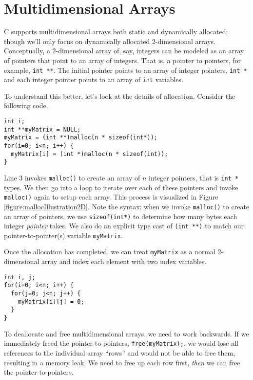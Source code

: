 \section{Multidimensional Arrays}

C supports multidimensional arrays both static and dynamically
allocated; though we'll only focus on dynamically allocated 2-dimensional
arrays.  Conceptually, a 2-dimensional array of, say, integers can
be modeled as an array of pointers that point to an array of integers.
That is, a pointer to pointers, for example, \texttt{int **}.  
The initial pointer points to an array of integer pointers, \texttt{int *}
and each integer pointer points to an array of \texttt{int} variables.

To understand this better, let's look at the details of allocation.  Consider
the following code.

\begin{verbatim}
int i;
int **myMatrix = NULL; 
myMatrix = (int **)malloc(n * sizeof(int*)); 
for(i=0; i<n; i++) {
  myMatrix[i] = (int *)malloc(n * sizeof(int)); 
}
\end{verbatim}

Line 3 invokes \texttt{malloc()} to create an array of $n$ integer
pointers, that is \texttt{int *} types.  We then go into a loop to
iterate over each of these pointers and invoke \texttt{malloc()} 
again to setup each array.  This process is visualized in Figure 
\ref{figure:mallocIllustration2D}.  Note the syntax: when we invoke \texttt{malloc()} to 
create an array of pointers, we use \texttt{sizeof(int*)} to
determine how many bytes each integer \emph{pointer} takes.  We
also do an explicit type cast of \texttt{(int **)} to match our
pointer-to-pointer(s) variable \texttt{myMatrix}.  



Once the allocation has completed, we can treat \texttt{myMatrix}
as a normal 2-dimensional array and index each element with two
index variables.

\begin{verbatim}
int i, j;
for(i=0; i<n; i++) {
  for(j=0; j<n; j++) {
    myMatrix[i][j] = 0;
  }
}
\end{verbatim}

To deallocate and free multidimensional arrays, we need to work backwards.
If we immediately freed the pointer-to-pointers, \texttt{free(myMatrix);}, 
we would lose all references to the individual array ``rows'' and would not
be able to free them, resulting in a \gls{memory leak}.  We need to free up 
each row first, \emph{then} we can free the pointer-to-pointers.

